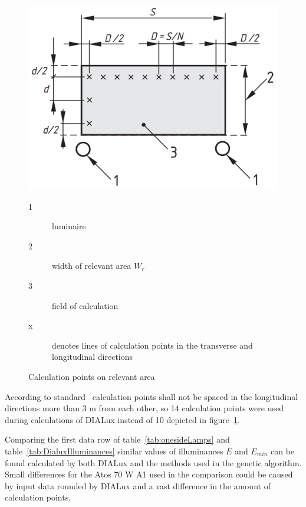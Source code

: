 \begin{figure}[htb]
  \centering
  \includegraphics[width=0.8\columnwidth]{13201-3_points}
	\begin{description}
		\item[1] luminaire
		\item[2] width of relevant area $W_{r}$
		\item[3] field of calculation
		\item[x] denotes lines of calculation points in the transverse and longitudinal directions
	\end{description}
	\caption{Calculation points on relevant area \cite{CSN_EN_13201-3}}
  \label{fig:Standard13210-3}
\end{figure}

According to standard~\cite{CSN_EN_13201-3} calculation points shall not be spaced in the longitudinal directions more than 3 m from each other, so 14 calculation points were used during calculations of DIALux instead of 10 depicted in figure~\ref{fig:Standard13210-3}.

Comparing the first data row of table~\ref{tab:onesideLamps} and table~\ref{tab:DialuxIlluminances} similar values of illuminances $\overline{E}$ and $E_{min}$ can be found calculated by both DIALux and the methods used in the genetic algorithm. Small differences for the Atos 70 W A1 used in the comparison could be caused by input data rounded by DIALux and a vast difference in the amount of calculation points.
